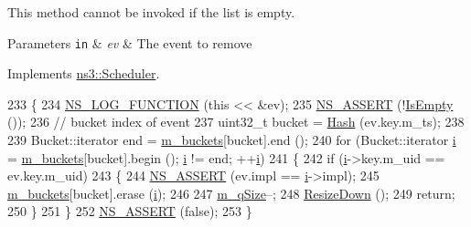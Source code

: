This method cannot be invoked if the list is empty.


\begin{DoxyParams}[1]{Parameters}
\mbox{\tt in}  & {\em ev} & The event to remove \\
\hline
\end{DoxyParams}


Implements \hyperlink{classns3_1_1Scheduler_a481d54e1b0e3c777629fd775862c66ca}{ns3\+::\+Scheduler}.


\begin{DoxyCode}
233 \{
234   \hyperlink{log-macros-disabled_8h_a90b90d5bad1f39cb1b64923ea94c0761}{NS\_LOG\_FUNCTION} (\textcolor{keyword}{this} << &ev);
235   \hyperlink{assert_8h_a6dccdb0de9b252f60088ce281c49d052}{NS\_ASSERT} (!\hyperlink{classns3_1_1CalendarScheduler_a3b77785ce158cd5c3979acf5ed0ae7a0}{IsEmpty} ());
236   \textcolor{comment}{// bucket index of event}
237   uint32\_t bucket = \hyperlink{classns3_1_1CalendarScheduler_ad60541150596324cac253040af4f8880}{Hash} (ev.key.m\_ts);
238 
239   Bucket::iterator end = \hyperlink{classns3_1_1CalendarScheduler_ad022479890e917ef6a64ef814284033e}{m\_buckets}[bucket].end ();
240   \textcolor{keywordflow}{for} (Bucket::iterator \hyperlink{bernuolliDistribution_8m_a6f6ccfcf58b31cb6412107d9d5281426}{i} = \hyperlink{classns3_1_1CalendarScheduler_ad022479890e917ef6a64ef814284033e}{m\_buckets}[bucket].begin (); \hyperlink{bernuolliDistribution_8m_a6f6ccfcf58b31cb6412107d9d5281426}{i} != end; ++\hyperlink{bernuolliDistribution_8m_a6f6ccfcf58b31cb6412107d9d5281426}{i})
241     \{
242       \textcolor{keywordflow}{if} (\hyperlink{bernuolliDistribution_8m_a6f6ccfcf58b31cb6412107d9d5281426}{i}->key.m\_uid == ev.key.m\_uid)
243         \{
244           \hyperlink{assert_8h_a6dccdb0de9b252f60088ce281c49d052}{NS\_ASSERT} (ev.impl == \hyperlink{bernuolliDistribution_8m_a6f6ccfcf58b31cb6412107d9d5281426}{i}->impl);
245           \hyperlink{classns3_1_1CalendarScheduler_ad022479890e917ef6a64ef814284033e}{m\_buckets}[bucket].erase (\hyperlink{bernuolliDistribution_8m_a6f6ccfcf58b31cb6412107d9d5281426}{i});
246 
247           \hyperlink{classns3_1_1CalendarScheduler_a24148e8feac3c068ab31317aee8f46c2}{m\_qSize}--;
248           \hyperlink{classns3_1_1CalendarScheduler_ad177bb1ae48629ed93d2ffc55aa52312}{ResizeDown} ();
249           \textcolor{keywordflow}{return};
250         \}
251     \}
252   \hyperlink{assert_8h_a6dccdb0de9b252f60088ce281c49d052}{NS\_ASSERT} (\textcolor{keyword}{false});
253 \}
\end{DoxyCode}


